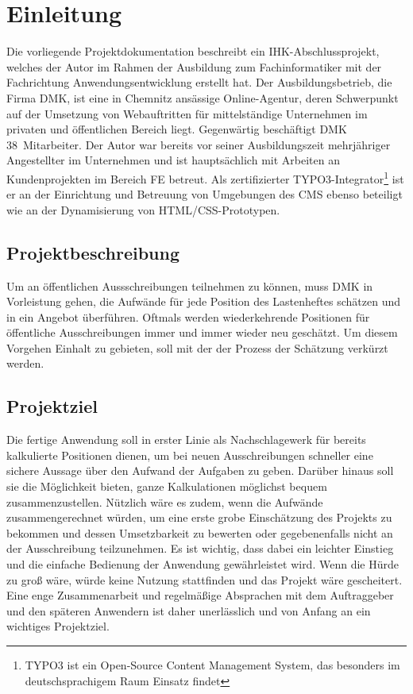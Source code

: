 \section{Einleitung}
\label{sec:Einleitung}
Die vorliegende Projektdokumentation beschreibt ein IHK-Abschlussprojekt,
welches der Autor im Rahmen der Ausbildung zum Fachinformatiker mit der
Fachrichtung Anwendungsentwicklung erstellt hat. Der Ausbildungsbetrieb, die
Firma \ac{DMK}, ist eine in Chemnitz ansässige Online-Agentur, deren Schwerpunkt
auf der Umsetzung von Webauftritten für mittelständige Unternehmen im privaten
und öffentlichen Bereich liegt. Gegenwärtig beschäftigt \acs{DMK}
38~Mitarbeiter. Der Autor war bereits vor seiner Ausbildungszeit mehrjähriger Angestellter im Unternehmen und ist hauptsächlich mit Arbeiten an
Kundenprojekten im Bereich \ac{FE} betreut. Als zertifizierter
TYPO3-Integrator\footnote{TYPO3 ist ein Open-Source Content Management System,
das besonders im deutschsprachigem Raum Einsatz findet} ist er an der
Einrichtung und Betreuung von Umgebungen des \acs{CMS} ebenso beteiligt wie an
der Dynamisierung von \acs{HTML}/\acs{CSS}-Prototypen.

\subsection{Projektbeschreibung} 
\label{sec:Projektbeschreibung}
Um an öffentlichen Aussschreibungen teilnehmen zu können, muss
\acs{DMK} in Vorleistung gehen, die Aufwände für jede Position des Lastenheftes
schätzen und in ein Angebot überführen. Oftmals werden wiederkehrende Positionen
für öffentliche Ausschreibungen immer und immer wieder neu geschätzt. Um diesem
Vorgehen Einhalt zu gebieten, soll mit der {\titel} der Prozess der Schätzung
verkürzt werden.

\subsection{Projektziel} 
\label{sec:Projektziel}
Die fertige Anwendung soll in erster Linie als Nachschlagewerk für bereits
kalkulierte Positionen dienen, um bei neuen Ausschreibungen
schneller eine sichere Aussage über den Aufwand der Aufgaben zu geben.
Darüber hinaus soll sie die Möglichkeit bieten, ganze Kalkulationen möglichst
bequem zusammenzustellen. Nützlich wäre es zudem, wenn die Aufwände
zusammengerechnet würden, um eine erste grobe Einschätzung des Projekts zu
bekommen und dessen Umsetzbarkeit zu bewerten oder gegebenenfalls nicht an der
Ausschreibung teilzunehmen. Es ist wichtig, dass dabei ein leichter Einstieg und
die einfache Bedienung der Anwendung gewährleistet wird. Wenn die Hürde zu groß
wäre, würde keine Nutzung stattfinden und das Projekt wäre gescheitert. Eine
enge Zusammenarbeit und regelmäßige Absprachen mit dem Auftraggeber und den
späteren Anwendern ist daher unerlässlich und von Anfang an ein wichtiges
Projektziel.

